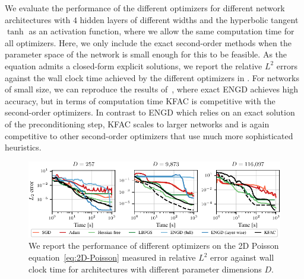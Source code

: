 We evaluate the performance of the different optimizers for different network architectures with $4$ hidden layers of different widths and the hyperbolic tangent $\tanh$ as an activation function, where we allow the same computation time for all optimizers. 
Here, we only include the exact second-order methods when the parameter space of the network is small enough for this to be feasible.
As the equation admits a closed-form explicit solutions, we report the relative $L^2$ errors against the wall clock time achieved by the different optimizers in . 
For networks of small size, we can reproduce the results of~\cite{muller2023achieving}, where exact ENGD achieves high accuracy, but in terms of computation time KFAC is competitive with the second-order optimizers. 
In contrast to ENGD which relies on an exact solution of the preconditioning step, KFAC scales to larger networks and is again competitive to other second-order optimizers that use much more sophisticated heuristics. 
\begin{figure}
    \centering
    \includegraphics{../kfac_pinns_exp/exp17_groupplot_poisson2d/l2_error_over_time.pdf}
    \caption{We report the performance of different optimizers on the 2D Poisson equation~\eqref{eq:2D-Poisson} measured in relative $L^2$ error against wall clock time for architectures with different parameter dimensions $D$.}
    \label{fig:2D-Poisson}
\end{figure}
